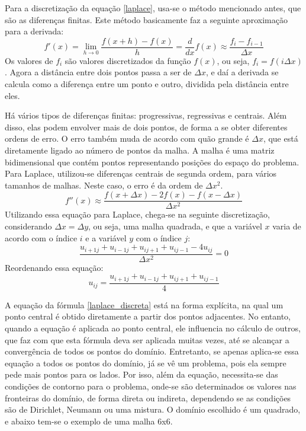 \documentclass[journal]{IEEEtran}
\begin{document}
Para a discretização da equação \ref{laplace}, usa-se o método mencionado antes, que são as diferenças finitas. Este método basicamente faz a seguinte aproximação para a derivada:
\begin{equation}
f'(x)=\lim_{h\rightarrow 0}\frac{f(x+h)-f(x)}{h}=\frac{d}{dx}f(x)\approx \frac{f_i-f_{i-1}}{\Delta x}
\end{equation}
Os valores de $f_i$ são valores discretizados da função $f(x)$, ou seja, $f_i=f(i\Delta x)$. Agora a distância entre dois pontos passa a ser de $\Delta x$, e daí a derivada se calcula como a diferença entre um ponto e outro, dividida pela distância entre eles. 

Há vários tipos de diferenças finitas: progressivas, regressivas e centrais. Além disso, elas podem envolver mais de dois pontos, de forma a se obter diferentes ordens de erro. O erro também muda de acordo com quão grande é $\Delta x$, que está diretamente ligado ao número de pontos da malha. A malha é uma matriz bidimensional que contém pontos representando posições do espaço do problema. Para Laplace, utilizou-se diferenças centrais de segunda ordem, para vários tamanhos de malhas. Neste caso, o erro é da ordem de $\Delta x^2$.
\begin{equation}
f''(x)\approx \frac{f(x+\Delta x)-2f(x)-f(x-\Delta x)}{\Delta x^2}
\end{equation}
Utilizando essa equação para Laplace, chega-se na seguinte discretização, considerando $\Delta x=\Delta y$, ou seja, uma malha quadrada, e que a variável $x$ varia de acordo com o índice $i$ e a variável $y$ com o índice $j$:
\begin{equation}
\frac{u_{i+1j}+u_{i-1j}+u_{ij+1}+u_{ij-1}-4u_{ij}}{\Delta x^2}=0 \label{laplace_discreta_zero}
\end{equation}
Reordenando essa equação:
\begin{equation}
  u_{ij}=\frac{u_{i+1j}+u_{i-1j}+u_{ij+1}+u_{ij-1}}{4} \label{laplace_discreta}
\end{equation}

A equação da fórmula \ref{laplace_discreta} está na forma explícita, na qual um ponto central é obtido diretamente a partir dos pontos adjacentes. No entanto, quando a equação é aplicada ao ponto central, ele influencia no cálculo de outros, que faz com que esta fórmula deva ser aplicada muitas vezes, até se alcançar a convergência de todos os pontos do domínio. Entretanto, se apenas aplica-se essa equação a todos os pontos do domínio, já se vê um problema, pois ela sempre pede mais pontos para os lados. Por isso, além da equação, necessita-se das condições de contorno para o problema, onde-se são determinados os valores nas fronteiras do domínio, de forma direta ou indireta, dependendo se as condições são de Dirichlet, Neumann ou uma mistura. O domínio escolhido é um quadrado, e abaixo tem-se o exemplo de uma malha 6x6.
\end{document}
